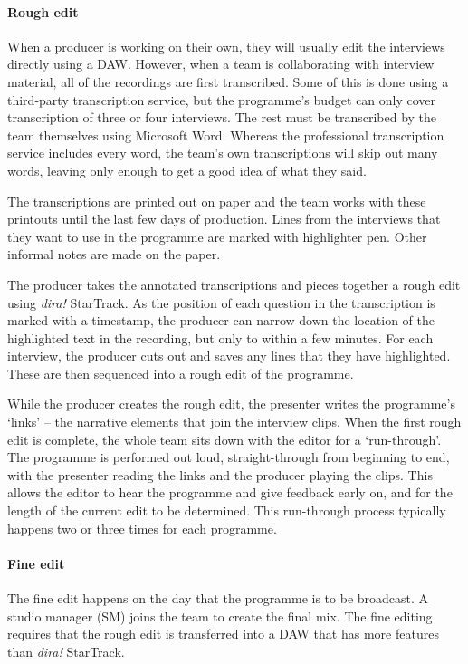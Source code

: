 \paragraph{Rough edit}
When a producer is working on their own, they will usually edit the interviews directly using a DAW. However, when a
team is collaborating with interview material, all of the recordings are first transcribed. Some of this is done using
a third-party transcription service, but the programme's budget can only cover transcription of three or four
interviews. The rest must be transcribed by the team themselves using Microsoft Word. Whereas the professional
transcription service includes every word, the team's own transcriptions will skip out many words, leaving only enough
to get a good idea of what they said.

The transcriptions are printed out on paper and the team works with these printouts until the last few days of
production. Lines from the interviews that they want to use in the programme are marked with highlighter pen. Other
informal notes are made on the paper.

The producer takes the annotated transcriptions and pieces together a rough edit using \textit{dira!} StarTrack. As the
position of each question in the transcription is marked with a timestamp, the producer can narrow-down the location of
the highlighted text in the recording, but only to within a few minutes. For each interview, the producer cuts out and
saves any lines that they have highlighted. These are then sequenced into a rough edit of the programme.

While the producer creates the rough edit, the presenter writes the programme's `links' -- the narrative elements that
join the interview clips. When the first rough edit is complete, the whole team sits down with the editor for a
`run-through'. The programme is performed out loud, straight-through from beginning to end, with the presenter reading
the links and the producer playing the clips. This allows the editor to hear the programme and give feedback early on,
and for the length of the current edit to be determined. This run-through process typically happens two or three times
for each programme.

\paragraph{Fine edit}
The fine edit happens on the day that the programme is to be broadcast. A studio manager (SM) joins the team to create
the final mix. The fine editing requires that the rough edit is transferred into a DAW that has more features than
\textit{dira!} StarTrack.

